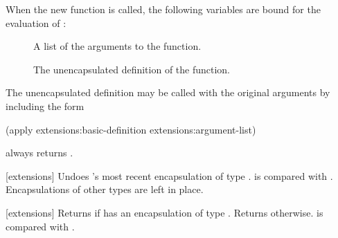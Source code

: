 When the new function is called, the following variables are bound for the
evaluation of :
\begin{description}

\item[]
A list of the arguments to the function.

\item[]
The unencapsulated definition of the
function.
\end{description}
The unencapsulated definition may be called with the original
arguments by including the form
\begin{lisp}
(apply extensions:basic-definition extensions:argument-list)
\end{lisp}

 always returns .
\enddefun

[extensions]{} Undoes
's most recent encapsulation of type .
 is compared with .  Encapsulations of other types
are left in place.
\enddefun

[extensions]{}
Returns  if  has an encapsulation of type .
Returns \nil{} otherwise.   is compared with .
\enddefun

